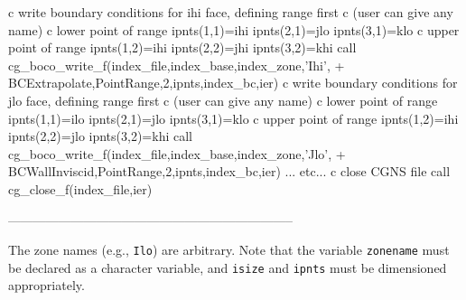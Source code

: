 \documentclass[12pt]{article}
\begin{document}
{\newline c  write boundary conditions for ihi face, defining range first 
\newline c  (user can give any name)
\newline c  lower point of range
\newline\indent      ipnts(1,1)=ihi
\newline\indent      ipnts(2,1)=jlo
\newline\indent      ipnts(3,1)=klo
\newline c  upper point of range
\newline\indent      ipnts(1,2)=ihi
\newline\indent      ipnts(2,2)=jhi
\newline\indent      ipnts(3,2)=khi
\newline\indent      call cg\_boco\_write\_f(index\_file,index\_base,index\_zone,'Ihi',
\newline + \indent BCExtrapolate,PointRange,2,ipnts,index\_bc,ier)
\newline c  write boundary conditions for jlo face, defining range first 
\newline c  (user can give any name)
\newline c  lower point of range
\newline\indent      ipnts(1,1)=ilo
\newline\indent      ipnts(2,1)=jlo
\newline\indent      ipnts(3,1)=klo
\newline c  upper point of range
\newline\indent      ipnts(1,2)=ihi
\newline\indent      ipnts(2,2)=jlo
\newline\indent      ipnts(3,2)=khi
\newline\indent      call cg\_boco\_write\_f(index\_file,index\_base,index\_zone,'Jlo',
\newline + \indent BCWallInviscid,PointRange,2,ipnts,index\_bc,ier)
\newline\indent\indent  ... etc...
\newline c  close CGNS file
\newline\indent      call cg\_close\_f(index\_file,ier)}

--------------------------------------------------------------------

\noindent The zone names (e.g., {\tt Ilo}) are arbitrary.  Note that 
the variable {\tt zonename} must be declared as a character variable, and
{\tt isize} and {\tt ipnts} must be dimensioned appropriately.
\end{document}
